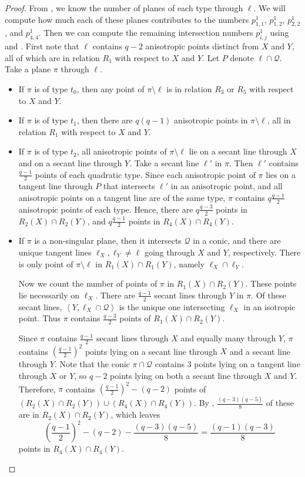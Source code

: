 \documentclass[a4paper]{article}
\theoremstyle{definition}
\newcommand{\vspan}[1]{\left \langle #1 \right \rangle}
\newcommand{\mq}{\mathcal Q}
\begin{document}
\begin{proof}
 From , we know the number of planes of each type through $\ell$.
 We will compute how much each of these planes contributes to the numbers $p^1_{1,1}$, $p^1_{1,2}$, $p^1_{2,2}$, and $p^1_{4,4}$.
 Then we can compute the remaining intersection numbers $p^1_{i,j}$ using  and .
 First note that $\ell$ contains $q-2$ anisotropic points distinct from $X$ and $Y$, all of which are in relation $R_1$ with respect to $X$ and $Y$.
 Let $P$ denote $\ell \cap \mq$.
 Take a plane $\pi$ through $\ell$.
 \begin{itemize}
  \item If $\pi$ is of type $t_0$, then any point of $\pi \setminus \ell$ is in relation $R_3$ or $R_5$ with respect to $X$ and $Y$.
  \item If $\pi$ is of type $t_1$, then there are $q(q-1)$ anisotropic points in $\pi \setminus \ell$, all in relation $R_1$ with respect to $X$ and $Y$.
  \item If $\pi$ is of type $t_2$, all anisotropic points of $\pi \setminus \ell$ lie on a secant line through $X$ and on a secant line through $Y$.
  Take a secant line $\ell'$ in $\pi$.
  Then $\ell'$ contains $\frac{q-1}2$ points of each quadratic type.
  Since each anisotropic point of $\pi$ lies on a tangent line through $P$ that intersects $\ell'$ in an anisotropic point, and all anisotropic points on a tangent line are of the same type, $\pi$ contains $q \frac{q-1}2$ anisotropic points of each type.
  Hence, there are $q\frac{q-3}2$ points in $R_2(X) \cap R_2(Y)$, and $q \frac{q-1}2$ points in $R_4(X) \cap R_4(Y)$.
  \item If $\pi$ is a non-singular plane, then it intersects $\mq$ in a conic, and there are unique tangent lines $\ell_X, \ell_Y \neq \ell$ going through $X$ and $Y$, respectively.
  There is only point of $\pi \setminus \ell$ in $R_1(X) \cap R_1(Y)$, namely $\ell_X \cap \ell_Y$.
  
  Now we count the number of points of $\pi$ in $R_1(X) \cap R_2(Y)$.
  These points lie necessarily on $\ell_X$.
  There are $\frac{q-1}2$ secant lines through $Y$ in $\pi$.
  Of these secant lines, $\vspan{Y,\ell_X \cap \mq}$ is the unique one intersecting $\ell_X$ in an isotropic point.
  Thus $\pi$ contains $\frac{q-3}2$ points of $R_1(X) \cap R_2(Y)$.
  
  Since $\pi$ contains $\frac{q-1}2$ secant lines through $X$ and equally many through $Y$, $\pi$ contains $\left(\frac{q-1}2 \right)^2$ points lying on a secant line through $X$ and a secant line through $Y$.
  Note that the conic $\pi \cap \mq$ contains $3$ points lying on a tangent line through $X$ or $Y$, so $q-2$ points lying on both a secant line through $X$ and $Y$.
  Therefore, $\pi$ contains $\left(\frac{q-1}2 \right)^2 - (q-2)$ points of $(R_2(X) \cap R_2(Y)) \cup (R_4(X) \cap R_4(Y))$.
  By , $\frac{(q-3)(q-5)}8$ of these are in $R_2(X) \cap R_2(Y)$, which leaves
  \[
   \left(\frac{q-1}2 \right)^2 - (q-2) - \frac{(q-3)(q-5)}8 = \frac{(q-1)(q-3)}8
  \]
  points in $R_4(X) \cap R_4(Y)$.
 \end{itemize}
 

\end{proof}
\end{document}
